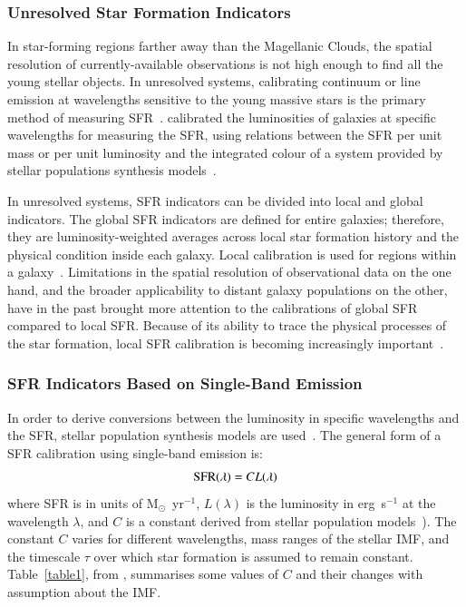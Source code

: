 \subsubsection{Unresolved Star Formation Indicators}

 In star-forming regions farther away than the Magellanic Clouds, the spatial resolution of currently-available observations is not high enough to find all the young stellar objects. 
 In unresolved systems, calibrating continuum or line emission at wavelengths sensitive to the young massive stars is the primary method of measuring SFR~\citep[e.g.,][]{Kennicutt98b, Kewley02, Bell03, Calzetti07, Calzetti08, Calzetti10, Calzetti13, Kennicutt07, Kennicutt09, Boquien10, Hao11, Kennicutt12}. 
\cite{Kennicutt98b} calibrated the luminosities of galaxies at specific wavelengths for measuring the SFR, using relations between the SFR per unit mass or per unit luminosity and the integrated colour of a system provided by stellar populations synthesis models~\citep[e.g.,][]{Bruzual93}. 

In unresolved systems, SFR indicators can be divided into local and global indicators. 
The global SFR indicators are defined for entire galaxies; therefore, they are luminosity-weighted averages across local star formation history and the physical condition inside each galaxy. 
Local calibration is used for regions within a galaxy~\citep[e.g.,][]{Zhu08, Kennicutt09, Boquien10, Boquien11, Hao11}.
Limitations in the spatial resolution of observational data on the one hand, and the broader applicability to distant galaxy populations on the other, have in the past brought more attention to the calibrations of global SFR compared to local SFR. 
Because of its ability to trace the physical processes of the star formation, local SFR calibration is becoming increasingly important~\citep{Calzetti13}.

\subsubsection*{SFR Indicators Based on Single-Band Emission}

In order to derive conversions between the luminosity in specific wavelengths and the SFR, stellar population synthesis models are used~\citep{Kennicutt98b}. 
The general form of a SFR calibration using single-band emission is: 
\begin{equation}
\label{equ: sfrsingle}
{\rm SFR}(\lambda)= CL(\lambda)
\end{equation}
where SFR is in units of M${_\odot}$~yr$^{-1}$, $L(\lambda)$ is the luminosity in erg~s$^{-1}$ at the wavelength $\lambda$, and $C$ is a constant derived from stellar population models~\citep[e.g, starburst99][]{Leitherer99}). 
The constant $C$ varies for different wavelengths, mass ranges of the stellar IMF, and the timescale $\tau$ over which star formation is assumed to remain constant. 
Table~\ref{table1}, from \cite{Calzetti13}, summarises some values of $C$ and their changes with assumption about the IMF. 

